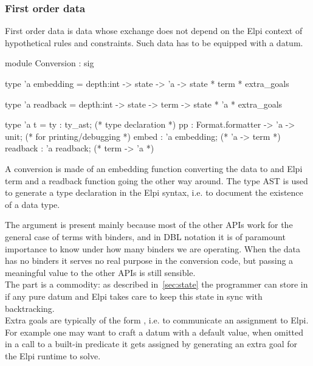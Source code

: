 \documentclass[a4paper, 11pt]{book}
\begin{document}


  
\subsubsection{First order data}\label{sec:fodata}\label{sec:opaquedata}

First order data is data whose exchange does not depend on the Elpi context
of hypothetical rules and constraints. Such data has to be
equipped with a  datum.

\begin{ocamlcode}
module Conversion : sig

type 'a embedding =
  depth:int ->
  state -> 'a -> state * term * extra_goals

type 'a readback =
  depth:int ->
  state -> term -> state * 'a * extra_goals

type 'a t = {
  ty : ty_ast;                         (* type declaration *)
  pp : Format.formatter -> 'a -> unit; (* for printing/debugging *)
  embed : 'a embedding;                (* 'a -> term *)
  readback : 'a readback;              (* term -> 'a *)
}
\end{ocamlcode}

\noindent
A conversion is made of an embedding function converting the data to
and Elpi term and a readback function going the other way around.
The type AST is used to generate a type declaration in the Elpi syntax,
i.e. to document the existence of a data type.

The  argument is present mainly because
most of the other APIs work for the general case of terms with binders,
and in DBL notation it is of paramount importance to know under how
many binders we are operating. When the data has no binders it serves
no real purpose in the conversion code, but passing a meaningful value
to the other APIs is still sensible.\\
The  part
is a commodity: as described in~\cref{sec:state} the programmer can store
in if any pure datum and Elpi takes care to keep this state in sync with
backtracking.\\
Extra goals are typically of the form , i.e. to communicate
an assignment to Elpi. For example one may want to craft a datum with a
default value, when omitted in a call to a built-in predicate it gets assigned
by generating an extra goal for the Elpi runtime to solve.
\end{document}

